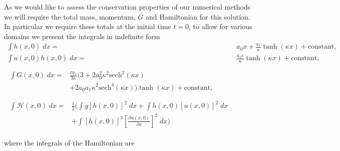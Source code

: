As we would like to assess the conservation properties of our numerical methods we will require the total mass, momentum, $G$ and Hamiltonian for this solution. In particular we require these totals at the initial time $t=0$, to allow for various domains we present the integrals in indefinite form 
\begin{subequations}
	\begin{align}
	\int h(x,0) \; dx = {} & a_0 x + \frac{a_1}{\kappa} \tanh\left(\kappa x\right) + \text{constant}, \\
	\int u(x,0)h(x,0) \;  dx = {} & \frac{a_1 c}{\kappa} \tanh\left(\kappa x\right)+ \text{constant}, \\  \nonumber \\
	\begin{split}
	\int G(x,0) \; dx = {}&  \frac{c a_1}{3 \kappa}  \Bigg(3 + 2a_0^2 \kappa^2\text{sech}^2\left(\kappa x\right)  \\ &+ 2a_0 a_1 \kappa^2 \text{sech}^4\left(\kappa x\right) \Bigg)\tanh\left(\kappa x\right)  + \text{constant} ,
	\end{split}
	\\  \nonumber \\
	\begin{split}
	\int \mathcal{H}(x,0) \; dx = {}&\frac{1}{2} \Bigg(\int g\left[h(x,0)\right]^2 \; dx + \int h(x,0)\left[u(x,0)\right]^2 \; dx  \\ &+ \int \left[h(x,0)\right]^3 \left[\frac{\partial u(x,0)}{\partial x}\right]^2 \; dx \Bigg) 
	\end{split}
	\end{align}
	\label{eqn:SolitonConservation}
\end{subequations}

where the integrals of the Hamiltonian are

